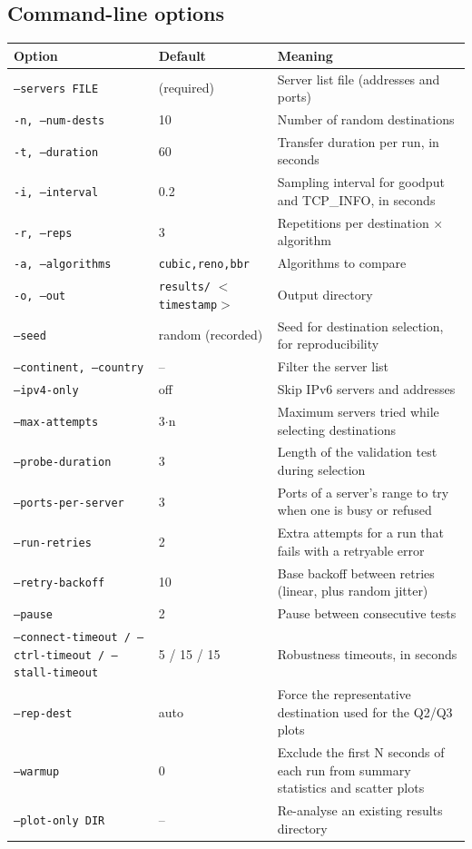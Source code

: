 \documentclass[10pt]{article}
\begin{document}
\subsection{Command-line options}
{\small
\begin{longtable}{@{}L{0.34\textwidth}L{0.14\textwidth}L{0.44\textwidth}@{}}
\toprule
Option & Default & Meaning \\
\midrule
\endhead
\texttt{--servers FILE} & (required) & Server list file (addresses and ports) \\
\texttt{-n, --num-dests} & 10 & Number of random destinations \\
\texttt{-t, --duration} & 60 & Transfer duration per run, in seconds \\
\texttt{-i, --interval} & 0.2 & Sampling interval for goodput and TCP\_INFO, in seconds \\
\texttt{-r, --reps} & 3 & Repetitions per destination × algorithm \\
\texttt{-a, --algorithms} & \texttt{cubic,reno,bbr} & Algorithms to compare \\
\texttt{-o, --out} & \texttt{results/} \texttt{$<$timestamp$>$} & Output directory \\
\texttt{--seed} & random (recorded) & Seed for destination selection, for reproducibility \\
\texttt{--continent, --country} & – & Filter the server list \\
\texttt{--ipv4-only} & off & Skip IPv6 servers and addresses \\
\texttt{--max-attempts} & 3$\cdot$n & Maximum servers tried while selecting destinations \\
\texttt{--probe-duration} & 3 & Length of the validation test during selection \\
\texttt{--ports-per-server} & 3 & Ports of a server's range to try when one is busy or refused \\
\texttt{--run-retries} & 2 & Extra attempts for a run that fails with a retryable error \\
\texttt{--retry-backoff} & 10 & Base backoff between retries (linear, plus random jitter) \\
\texttt{--pause} & 2 & Pause between consecutive tests \\
\texttt{--connect-timeout / --ctrl-timeout / --stall-timeout} & 5 / 15 / 15 & Robustness timeouts, in seconds \\
\texttt{--rep-dest} & auto & Force the representative destination used for the Q2/Q3 plots \\
\texttt{--warmup} & 0 & Exclude the first N seconds of each run from summary statistics and scatter plots \\
\texttt{--plot-only DIR} & – & Re-analyse an existing results directory \\
\bottomrule
\end{longtable}}
\end{document}
